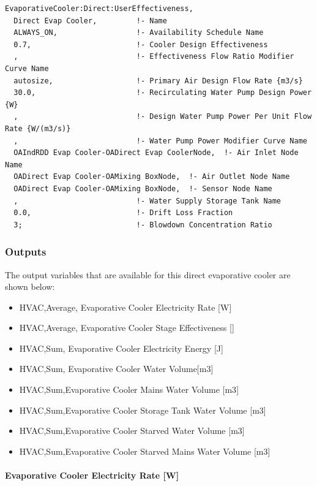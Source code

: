 \begin{lstlisting}
EvaporativeCooler:Direct:UserEffectiveness,
  Direct Evap Cooler,         !- Name
  ALWAYS_ON,                  !- Availability Schedule Name
  0.7,                        !- Cooler Design Effectiveness
  ,                           !- Effectiveness Flow Ratio Modifier Curve Name
  autosize,                   !- Primary Air Design Flow Rate {m3/s}
  30.0,                       !- Recirculating Water Pump Design Power {W}
  ,                           !- Design Water Pump Power Per Unit Flow Rate {W/(m3/s)}
  ,                           !- Water Pump Power Modifier Curve Name
  OAIndRDD Evap Cooler-OADirect Evap CoolerNode,  !- Air Inlet Node Name
  OADirect Evap Cooler-OAMixing BoxNode,  !- Air Outlet Node Name
  OADirect Evap Cooler-OAMixing BoxNode,  !- Sensor Node Name
  ,                           !- Water Supply Storage Tank Name
  0.0,                        !- Drift Loss Fraction
  3;                          !- Blowdown Concentration Ratio
\end{lstlisting}

\subsubsection{Outputs}\label{outputs-1-009}

The output variables that are available for this direct evaporative cooler are shown below:

\begin{itemize}
\item
  HVAC,Average, Evaporative Cooler Electricity Rate {[}W{]}
\item
  HVAC,Average, Evaporative Cooler Stage Effectiveness {[]}
\item
  HVAC,Sum, Evaporative Cooler Electricity Energy {[}J{]}
\item
  HVAC,Sum, Evaporative Cooler Water Volume{[}m3{]}
\item
  HVAC,Sum,Evaporative Cooler Mains Water Volume {[}m3{]}
\item
  HVAC,Sum,Evaporative Cooler Storage Tank Water Volume {[}m3{]}
\item
  HVAC,Sum,Evaporative Cooler Starved Water Volume {[}m3{]}
\item
  HVAC,Sum,Evaporative Cooler Starved Mains Water Volume {[}m3{]}
\end{itemize}

\paragraph{Evaporative Cooler Electricity Rate {[}W{]}}\label{evaporative-cooler-electric-powerw-1}

